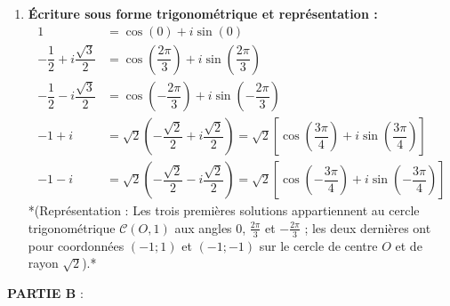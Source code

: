 \documentclass[12pt,a4paper]{article}
\begin{document}
\begin{enumerate}
    \item \textbf{Écriture sous forme trigonométrique et représentation :}
    $$
    \begin{aligned}
        1 &= \cos(0) + i\sin(0) \\
        -\dfrac{1}{2} + i\dfrac{\sqrt{3}}{2} &= \cos\left(\dfrac{2\pi}{3}\right) + i\sin\left(\dfrac{2\pi}{3}\right) \\
        -\dfrac{1}{2} - i\dfrac{\sqrt{3}}{2} &= \cos\left(-\dfrac{2\pi}{3}\right) + i\sin\left(-\dfrac{2\pi}{3}\right) \\
        -1 + i &= \sqrt{2}\left(-\dfrac{\sqrt{2}}{2} + i\dfrac{\sqrt{2}}{2}\right) = \sqrt{2}\left[\cos\left(\dfrac{3\pi}{4}\right) + i\sin\left(\dfrac{3\pi}{4}\right)\right] \\
        -1 - i &= \sqrt{2}\left(-\dfrac{\sqrt{2}}{2} - i\dfrac{\sqrt{2}}{2}\right) = \sqrt{2}\left[\cos\left(-\dfrac{3\pi}{4}\right) + i\sin\left(-\dfrac{3\pi}{4}\right)\right]
    \end{aligned}
    $$
    *(Représentation : Les trois premières solutions appartiennent au cercle trigonométrique $\mathcal{C}(O, 1)$ aux angles $0$, $\frac{2\pi}{3}$ et $-\frac{2\pi}{3}$ ; les deux dernières ont pour coordonnées $(-1 ; 1)$ et $(-1 ; -1)$ sur le cercle de centre $O$ et de rayon $\sqrt{2}$).*
\end{enumerate}

\textbf{PARTIE B} :
\end{document}
